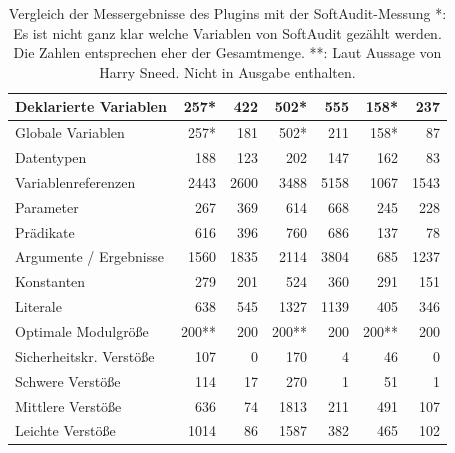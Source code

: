 \documentclass[gb,ngerman]{stthesis}
\begin{document}
\begin{table} [!p]
\begin{tabu}{|p{0.27\textwidth}||r|r||r|r||r|r|}
    				\hline
    				Deklarierte Variablen & 257* & 422 & 502* & 555 & 158* & 237\\
    				\hline
    				Globale Variablen & 257* & 181 & 502* & 211 & 158* & 87\\
    				\hline
    				Datentypen & 188 & 123 & 202 & 147 & 162 & 83\\
    				\hline
    				Variablenreferenzen & 2443 & 2600 & 3488 & 5158 & 1067 & 1543\\
    				\hline
    				Parameter & 267 & 369 & 614 & 668 & 245 & 228\\
    				\hline
    				Prädikate & 616 & 396 & 760 & 686 & 137 & 78\\
    				\hline
    				Argumente / Ergebnisse & 1560 & 1835 & 2114 & 3804 & 685 & 1237\\
    				\hline
    				Konstanten & 279 & 201 & 524 & 360 & 291 & 151\\
    				\hline
    				Literale & 638 & 545 & 1327 & 1139 & 405 & 346\\
    				\hline
    				Optimale Modulgröße  & 200** & 200 & 200** & 200 & 200** & 200\\
    				\hline
    				Sicherheitskr. Verstöße & 107 & 0 & 170 & 4 & 46 & 0\\
    				\hline
    				Schwere Verstöße & 114 & 17 & 270 & 1 & 51 & 1\\
    				\hline
    				Mittlere Verstöße & 636 & 74 & 1813 & 211 & 491 & 107\\
    				\hline
    				Leichte Verstöße & 1014 & 86 & 1587 & 382 & 465 & 102\\
    				\hline
  				\end{tabu}  
  				\caption{Vergleich der Messergebnisse des Plugins mit der SoftAudit-Messung \newline
  				 *: Es ist nicht ganz klar welche Variablen von SoftAudit gezählt werden. Die Zahlen entsprechen eher der Gesamtmenge. \newline
  				**: Laut Aussage von Harry Sneed. Nicht in Ausgabe enthalten.}
				\label{measuretable}
  			\end{table}
\end{document}
